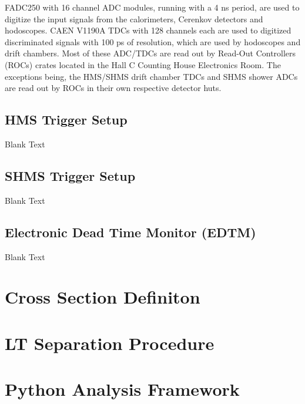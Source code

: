 \documentclass[
]{report}
\begin{document}
FADC250 with 16 channel ADC modules, running with a 4 ns period, are
used to digitize the input signals from the calorimeters, Cerenkov
detectors and hodoscopes. CAEN V1190A TDCs with 128 channels each are
used to digitized discriminated signals with 100 ps of resolution, which
are used by hodoscopes and drift chambers. Most of these ADC/TDCs are
read out by Read-Out Controllers (ROCs) crates located in the Hall C
Counting House Electronics Room. The exceptions being, the HMS/SHMS
drift chamber TDCs and SHMS shower ADCs are read out by ROCs in their
own respective detector huts.

\hypertarget{hms-trigger-setup}{%
\subsection{HMS Trigger Setup}\label{hms-trigger-setup}}

Blank Text

\hypertarget{shms-trigger-setup}{%
\subsection{SHMS Trigger Setup}\label{shms-trigger-setup}}

Blank Text

\hypertarget{electronic-dead-time-monitor-edtm}{%
\subsection{Electronic Dead Time Monitor
(EDTM)}\label{electronic-dead-time-monitor-edtm}}

Blank Text \label{Chapter-5}

\hypertarget{Section-5.1}{%
\section{Cross Section Definiton}\label{Section-5.1}}

\hypertarget{Section-5.2}{%
\section{LT Separation Procedure}\label{Section-5.2}}

\hypertarget{Section-5.3}{%
\section{Python Analysis Framework}\label{Section-5.3}}
\end{document}
